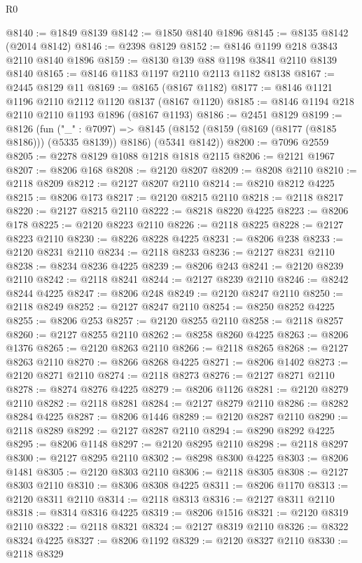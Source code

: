 \begin{lexlean}{R0}
\begin{coremodule}
@8140 := @1849 @8139
@8142 := @1850 @8140 @1896
@8145 := @8135 @8142 (@2014 @8142)
@8146 := @2398 @8129
@8152 := @8146 @1199 @218 @3843 @2110 @8140 @1896
@8159 := @8130 @139 @88 @1198 @3841 @2110 @8139 @8140
@8165 := @8146 @1183 @1197 @2110 @2113 @1182 @8138
@8167 := @2445 @8129 @11
@8169 := @8165 (@8167 @1182)
@8177 := @8146 @1121 @1196 @2110 @2112 @1120 @8137 (@8167 @1120)
@8185 := @8146 @1194 @218 @2110 @2110 @1193 @1896 (@8167 @1193)
@8186 := @2451 @8129
@8199 := @8126
    (fun ("_" : @7097) =>
    @8145 (@8152 (@8159 (@8169 (@8177 (@8185 @8186))) (@5335 @8139)) @8186) (@5341 @8142))
@8200 := @7096 @2559
@8205 := @2278 @8129 @1088 @1218 @1818 @2115
@8206 := @2121 @1967
@8207 := @8206 @168
@8208 := @2120 @8207
@8209 := @8208 @2110
@8210 := @2118 @8209
@8212 := @2127 @8207 @2110
@8214 := @8210 @8212 @4225
@8215 := @8206 @173
@8217 := @2120 @8215 @2110
@8218 := @2118 @8217
@8220 := @2127 @8215 @2110
@8222 := @8218 @8220 @4225
@8223 := @8206 @178
@8225 := @2120 @8223 @2110
@8226 := @2118 @8225
@8228 := @2127 @8223 @2110
@8230 := @8226 @8228 @4225
@8231 := @8206 @238
@8233 := @2120 @8231 @2110
@8234 := @2118 @8233
@8236 := @2127 @8231 @2110
@8238 := @8234 @8236 @4225
@8239 := @8206 @243
@8241 := @2120 @8239 @2110
@8242 := @2118 @8241
@8244 := @2127 @8239 @2110
@8246 := @8242 @8244 @4225
@8247 := @8206 @248
@8249 := @2120 @8247 @2110
@8250 := @2118 @8249
@8252 := @2127 @8247 @2110
@8254 := @8250 @8252 @4225
@8255 := @8206 @253
@8257 := @2120 @8255 @2110
@8258 := @2118 @8257
@8260 := @2127 @8255 @2110
@8262 := @8258 @8260 @4225
@8263 := @8206 @1376
@8265 := @2120 @8263 @2110
@8266 := @2118 @8265
@8268 := @2127 @8263 @2110
@8270 := @8266 @8268 @4225
@8271 := @8206 @1402
@8273 := @2120 @8271 @2110
@8274 := @2118 @8273
@8276 := @2127 @8271 @2110
@8278 := @8274 @8276 @4225
@8279 := @8206 @1126
@8281 := @2120 @8279 @2110
@8282 := @2118 @8281
@8284 := @2127 @8279 @2110
@8286 := @8282 @8284 @4225
@8287 := @8206 @1446
@8289 := @2120 @8287 @2110
@8290 := @2118 @8289
@8292 := @2127 @8287 @2110
@8294 := @8290 @8292 @4225
@8295 := @8206 @1148
@8297 := @2120 @8295 @2110
@8298 := @2118 @8297
@8300 := @2127 @8295 @2110
@8302 := @8298 @8300 @4225
@8303 := @8206 @1481
@8305 := @2120 @8303 @2110
@8306 := @2118 @8305
@8308 := @2127 @8303 @2110
@8310 := @8306 @8308 @4225
@8311 := @8206 @1170
@8313 := @2120 @8311 @2110
@8314 := @2118 @8313
@8316 := @2127 @8311 @2110
@8318 := @8314 @8316 @4225
@8319 := @8206 @1516
@8321 := @2120 @8319 @2110
@8322 := @2118 @8321
@8324 := @2127 @8319 @2110
@8326 := @8322 @8324 @4225
@8327 := @8206 @1192
@8329 := @2120 @8327 @2110
@8330 := @2118 @8329

\end{coremodule}
\end{lexlean}
